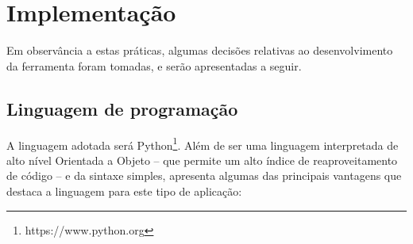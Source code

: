 \section{Implementação}


Em observância a estas práticas, algumas decisões relativas ao desenvolvimento da ferramenta foram tomadas, e serão apresentadas a seguir.


\subsection{Linguagem de programação}

A linguagem adotada será Python\footnote{https://www.python.org}. Além de ser uma linguagem interpretada de alto nível Orientada a Objeto -- que permite um alto índice de reaproveitamento de código -- e da sintaxe simples,  apresenta algumas das principais vantagens que destaca a linguagem para este tipo de aplicação:

